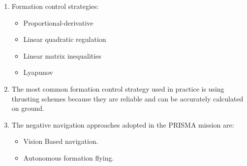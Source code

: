 \documentclass[a4paper]{article}
\begin{document}
\begin{enumerate}[label=\emph{\alph*)},series=preguntas1_1]
  \item %
    Formation control strategies:
  \begin{itemize}
    \item Proportional-derivative
    \item Linear quadratic regulation
    \item Linear matrix inequalities
    \item Lyapunov
  \end{itemize}

  \item %
    The most common formation control strategy used in practice is using thrusting schemes because they are reliable and can be accurately calculated on ground. 

  \item %
    The negative navigation approaches adopted in the PRISMA mission are:
    \begin{itemize}
      \item Vision Based navigation.
      \item Autonomous formation flying. 
   \end{itemize}

\end{enumerate}
\end{document}
